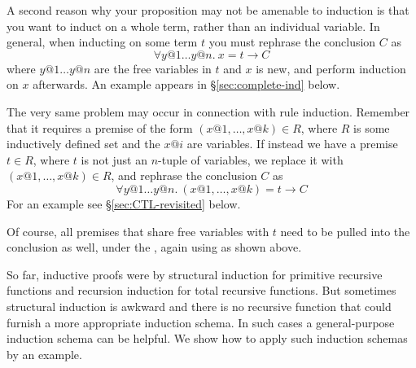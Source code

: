 \begin{isabellebody}
\begin{isamarkuptext}
A second reason why your proposition may not be amenable to induction is that
you want to induct on a whole term, rather than an individual variable. In
general, when inducting on some term $t$ you must rephrase the conclusion $C$
as
\[ \forall y@1 \dots y@n.~ x = t \longrightarrow C \]
where $y@1 \dots y@n$ are the free variables in $t$ and $x$ is new, and
perform induction on $x$ afterwards. An example appears in
\S\ref{sec:complete-ind} below.

The very same problem may occur in connection with rule induction. Remember
that it requires a premise of the form $(x@1,\dots,x@k) \in R$, where $R$ is
some inductively defined set and the $x@i$ are variables.  If instead we have
a premise $t \in R$, where $t$ is not just an $n$-tuple of variables, we
replace it with $(x@1,\dots,x@k) \in R$, and rephrase the conclusion $C$ as
\[ \forall y@1 \dots y@n.~ (x@1,\dots,x@k) = t \longrightarrow C \]
For an example see \S\ref{sec:CTL-revisited} below.

Of course, all premises that share free variables with $t$ need to be pulled into
the conclusion as well, under the \isa{{\isasymforall}}, again using \isa{{\isasymlongrightarrow}} as shown above.%
\end{isamarkuptext}%
%
%
\begin{isamarkuptext}%
\label{sec:complete-ind}
So far, inductive proofs were by structural induction for
primitive recursive functions and recursion induction for total recursive
functions. But sometimes structural induction is awkward and there is no
recursive function that could furnish a more appropriate
induction schema. In such cases a general-purpose induction schema can
be helpful. We show how to apply such induction schemas by an example.


\end{isamarkuptext}
\end{isabellebody}
